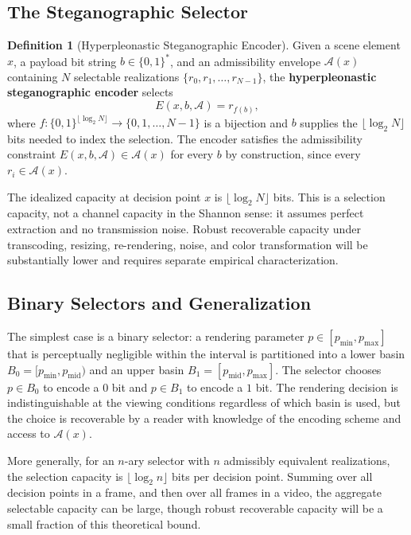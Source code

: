 \documentclass[12pt,a4paper]{article}
\theoremstyle{plain}
\theoremstyle{definition}
\newtheorem{definition}[theorem]{Definition}
\theoremstyle{remark}
\begin{document}
\subsection{The Steganographic Selector}

\begin{definition}[Hyperpleonastic Steganographic Encoder]
\label{def:steg}
Given a scene element $x$, a payload bit string $b \in \{0,1\}^*$, and an admissibility envelope $\mathcal{A}(x)$ containing $N$ selectable realizations $\{r_0, r_1, \ldots, r_{N-1}\}$, the \textbf{hyperpleonastic steganographic encoder} selects
\[
E(x, b, \mathcal{A}) = r_{f(b)},
\]
where $f : \{0,1\}^{\lfloor \log_2 N \rfloor} \to \{0, 1, \ldots, N-1\}$ is a bijection and $b$ supplies the $\lfloor \log_2 N \rfloor$ bits needed to index the selection. The encoder satisfies the admissibility constraint $E(x, b, \mathcal{A}) \in \mathcal{A}(x)$ for every $b$ by construction, since every $r_i \in \mathcal{A}(x)$.
\end{definition}

The idealized capacity at decision point $x$ is $\lfloor \log_2 N \rfloor$ bits. This is a selection capacity, not a channel capacity in the Shannon sense: it assumes perfect extraction and no transmission noise. Robust recoverable capacity under transcoding, resizing, re-rendering, noise, and color transformation will be substantially lower and requires separate empirical characterization.

\subsection{Binary Selectors and Generalization}

The simplest case is a binary selector: a rendering parameter $p \in [p_{\min}, p_{\max}]$ that is perceptually negligible within the interval is partitioned into a lower basin $B_0 = [p_{\min}, p_{\mathrm{mid}})$ and an upper basin $B_1 = [p_{\mathrm{mid}}, p_{\max}]$. The selector chooses $p \in B_0$ to encode a $0$ bit and $p \in B_1$ to encode a $1$ bit. The rendering decision is indistinguishable at the viewing conditions regardless of which basin is used, but the choice is recoverable by a reader with knowledge of the encoding scheme and access to $\mathcal{A}(x)$.

More generally, for an $n$-ary selector with $n$ admissibly equivalent realizations, the selection capacity is $\lfloor \log_2 n \rfloor$ bits per decision point. Summing over all decision points in a frame, and then over all frames in a video, the aggregate selectable capacity can be large, though robust recoverable capacity will be a small fraction of this theoretical bound.
\end{document}
